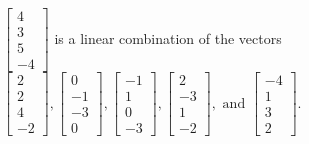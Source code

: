 \begin{exercise}
\begin{exerciseStatement}
  \end{exerciseStatement}
  \begin{exerciseAnswer}
   \(\left[\begin{array}{c}
4 \\
3 \\
5 \\
-4
\end{array}\right]\) 
  	 is  
	a linear combination of the vectors \(\left[\begin{array}{c}
2 \\
2 \\
4 \\
-2
\end{array}\right] , \left[\begin{array}{c}
0 \\
-1 \\
-3 \\
0
\end{array}\right] , \left[\begin{array}{c}
-1 \\
1 \\
0 \\
-3
\end{array}\right] , \left[\begin{array}{c}
2 \\
-3 \\
1 \\
-2
\end{array}\right] , \text{ and } \left[\begin{array}{c}
-4 \\
1 \\
3 \\
2
\end{array}\right]\).

	
  


  \end{exerciseAnswer}
\end{exercise}